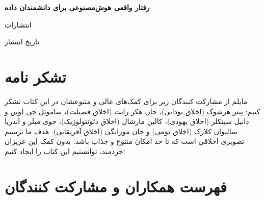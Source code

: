 \documentclass[12pt,oneside]{book}
\begin{document}
    \frontmatter

    \begin{titlepage}
        \begin{center}
            \vspace*{1cm}

            {\huge \textbf{رفتار واقعی هوش‌مصنوعی برای دانشمندان داده}}

            \vspace{0.5cm}
            \LARGE


            \LARGE انتشارات

            \large تاریخ انتشار

        \end{center}
    \end{titlepage}

    \tableofcontents

    \newpage

    \section*{تشکر نامه}
    مایلم از مشارکت کنندگان زیر برای کمک‌های عالی و متنوعشان در این کتاب تشکر کنیم: پیتر هرشوک (اخلاق بودایی)، جان هکر رایت (اخلاق فضیلت)، ساموئل جی لوین و دانیل سینکلر (اخلاق یهودی)، کالین مارشال (اخلاق دئونتولوژیک)، جوی میلر و آندریا سالیوان کلارک (اخلاق بومی) و جان مورانگی (اخلاق آفریقایی). هدف ما ترسیم تصویری اخلاقی است که تا حد امکان منتوع و جذاب باشد. بدون کمک این عزیزان خردمند، توانستیم این کتاب را ایجاد کنیم!

    \newpage

    \section*{فهرست همکاران و مشارکت کنندگان}
\end{document}
